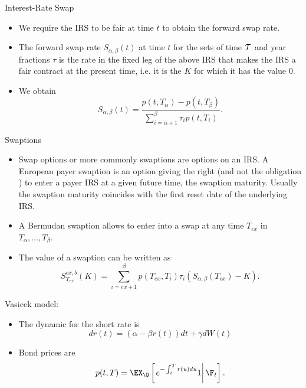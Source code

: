 {Interest-Rate Swap}

\begin{itemize}
\item<1-> We require the IRS to be fair at time $t$ to obtain the
forward swap rate.
\item<2->
The forward swap rate $S_{\alpha,\beta}(t)$ at time $t$ for the
sets of time $\cal T$ and year fractions $\tau$ is the rate in the
fixed leg of the above IRS that makes the IRS a fair contract at
the present time, i.e. it is the $K$ for which
it has the value $0$.
\item<3->
 We obtain
\begin{equation}\label{FSR-1}
S_{\alpha,\beta}(t)=\frac{p(t,T_{\alpha})-p(t,T_{\beta})}{\sum_{i=\alpha+1}^{\beta}\tau_ip(t,T_i)}.
\end{equation}
\end{itemize}




{Swaptions}
\begin{itemize}
\item<1->Swap options or more commonly swaptions are options on an IRS. A
European payer swaption is an option giving the right (and not the
obligation ) to enter a payer IRS at a given future time, the
swaption maturity. Usually the swaption maturity coincides with
the first reset date of the underlying IRS.
\item<2->
A Bermudan swaption allows to enter into a swap at any time $T_{ex}$ in $T_\alpha, \ldots,
T_\beta$.
\item<3-> The value of  a swaption can be written as
$$
S_{T_{ex}}^{ex,b}(K)= \sum_{i=ex+1}^{\beta} p(T_{ex},T_i)\tau_i(S_{\alpha,\beta}(T_{ex})-K).
$$
\end{itemize}


{Vasicek model:}
\begin{itemize}
\item<1-> The dynamic for the short rate is
$$
dr(t) = (\alpha -\beta r(t))dt +\gamma dW(t)
$$
\item<2-> Bond prices are
$$
p(t,T) = \EX_{\Q} \left[\left. e^{- \int_t^T r(u) du} 1
\right| \F_t \right].
$$
\end{itemize}




